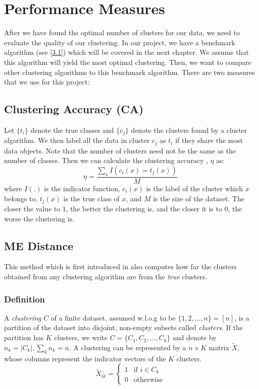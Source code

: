 
\section{Performance Measures} \label{2.3}
After we have found the optimal number of clusters for our data, we need to evaluate the quality of our clustering. In our project, we have a benchmark algorithm (see \ref{3.1}) which will be covered in the next chapter. We assume that this algorithm will yield the most optimal clustering. Then, we want to compare other clustering algorithms to this benchmark algorithm. There are two measures that we use for this project: 
\subsection{Clustering Accuracy (CA)} \label{2.3.1}
Let $\{t_i\}$ denote the true classes and $\{c_j\}$ denote the clusters found by a cluster algorithm. We then label all the data in cluster $c_j$ as $t_i$ if they share the most data objects. Note that the number of clusters need not be the same as the number of classes. Then we can calculate the clustering accuracy \cite{Wang}, $\eta$ as:
\begin{equation*}
\eta = \frac{\sum_x I(c_i(x) = t_j(x))}{M}
\end{equation*}
where $I(.)$ is the indicator function, $c_i(x)$ is the label of the cluster which $x$ belongs to, $t_j(x)$ is the true class of $x$, and $M$ is the size of the dataset. The closer the value to $1$, the better the clustering is, and the closer it is to $0$, the worse the clustering is.

\subsection{ME Distance} \label{2.3.2}
This method which is first introduced in \cite{Meila} also computes how far the clusters obtained from any clustering algorithm are from the \textit{true} clusters. 
\subsubsection{Definition}
A \textit{clustering} $C$ of a finite dataset, assumed w.l.o.g to be $\{1,2,\dots,n\} = [n]$, is a partition of the dataset into disjoint, non-empty subsets called \textit{clusters}. If the partition has $K$ clusters, we write $C=\{C_1,C_2,\dots,C_k\}$ and denote by $n_k= |C_k|, \sum_k n_k = n$. A clustering can be represented by a $n \times K$ matrix $\tilde{X}$, whose columns represent the indicator vectors of the $K$ clusters. 
\begin{equation*}
\tilde{X}_{ik} = \begin{cases}
1 & \text{if $i \in C_k$} \\
0 & \text{otherwise}
\end{cases}
\end{equation*}

